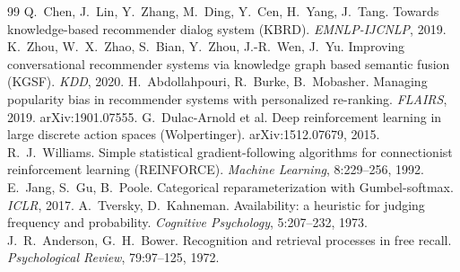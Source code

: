 \documentclass[11pt]{article}
\begin{document}
\begin{thebibliography}{99}
 Q.~Chen, J.~Lin, Y.~Zhang, M.~Ding, Y.~Cen, H.~Yang, J.~Tang. Towards knowledge-based recommender dialog system (KBRD). \emph{EMNLP-IJCNLP}, 2019.
 K.~Zhou, W.~X.~Zhao, S.~Bian, Y.~Zhou, J.-R.~Wen, J.~Yu. Improving conversational recommender systems via knowledge graph based semantic fusion (KGSF). \emph{KDD}, 2020.
 H.~Abdollahpouri, R.~Burke, B.~Mobasher. Managing popularity bias in recommender systems with personalized re-ranking. \emph{FLAIRS}, 2019. arXiv:1901.07555.
 G.~Dulac-Arnold et al. Deep reinforcement learning in large discrete action spaces (Wolpertinger). arXiv:1512.07679, 2015.
 R.~J.~Williams. Simple statistical gradient-following algorithms for connectionist reinforcement learning (REINFORCE). \emph{Machine Learning}, 8:229--256, 1992.
 E.~Jang, S.~Gu, B.~Poole. Categorical reparameterization with Gumbel-softmax. \emph{ICLR}, 2017.
 A.~Tversky, D.~Kahneman. Availability: a heuristic for judging frequency and probability. \emph{Cognitive Psychology}, 5:207--232, 1973.
 J.~R.~Anderson, G.~H.~Bower. Recognition and retrieval processes in free recall. \emph{Psychological Review}, 79:97--125, 1972.
\end{thebibliography}
\end{document}
